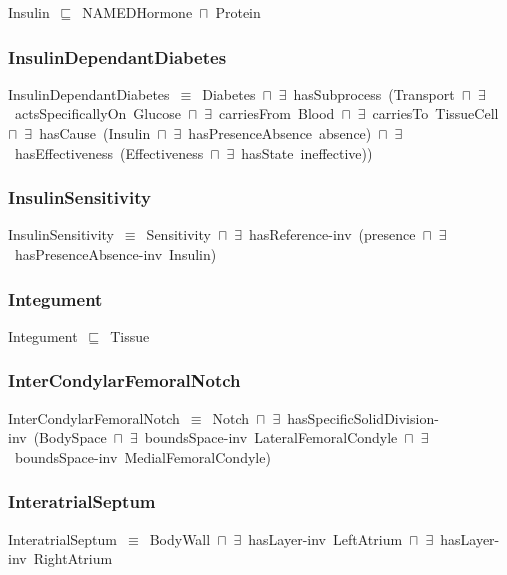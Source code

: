 \documentclass{article}
\begin{document}
Insulin~\ensuremath{\sqsubseteq}~NAMEDHormone~\ensuremath{\sqcap}~Protein~

\subsubsection*{InsulinDependantDiabetes}

InsulinDependantDiabetes~\ensuremath{\equiv}~Diabetes~\ensuremath{\sqcap}~\ensuremath{\exists}~hasSubprocess~(Transport~\ensuremath{\sqcap}~\ensuremath{\exists}~actsSpecificallyOn~Glucose~\ensuremath{\sqcap}~\ensuremath{\exists}~carriesFrom~Blood~\ensuremath{\sqcap}~\ensuremath{\exists}~carriesTo~TissueCell~\ensuremath{\sqcap}~\ensuremath{\exists}~hasCause~(Insulin~\ensuremath{\sqcap}~\ensuremath{\exists}~hasPresenceAbsence~absence)~\ensuremath{\sqcap}~\ensuremath{\exists}~hasEffectiveness~(Effectiveness~\ensuremath{\sqcap}~\ensuremath{\exists}~hasState~ineffective))

\subsubsection*{InsulinSensitivity}

InsulinSensitivity~\ensuremath{\equiv}~Sensitivity~\ensuremath{\sqcap}~\ensuremath{\exists}~hasReference-inv~(presence~\ensuremath{\sqcap}~\ensuremath{\exists}~hasPresenceAbsence-inv~Insulin)

\subsubsection*{Integument}

Integument~\ensuremath{\sqsubseteq}~Tissue~

\subsubsection*{InterCondylarFemoralNotch}

InterCondylarFemoralNotch~\ensuremath{\equiv}~Notch~\ensuremath{\sqcap}~\ensuremath{\exists}~hasSpecificSolidDivision-inv~(BodySpace~\ensuremath{\sqcap}~\ensuremath{\exists}~boundsSpace-inv~LateralFemoralCondyle~\ensuremath{\sqcap}~\ensuremath{\exists}~boundsSpace-inv~MedialFemoralCondyle)

\subsubsection*{InteratrialSeptum}

InteratrialSeptum~\ensuremath{\equiv}~BodyWall~\ensuremath{\sqcap}~\ensuremath{\exists}~hasLayer-inv~LeftAtrium~\ensuremath{\sqcap}~\ensuremath{\exists}~hasLayer-inv~RightAtrium
\end{document}
